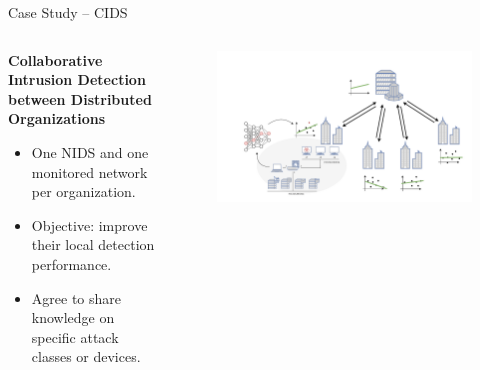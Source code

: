 \begin{frame}{Case Study -- CIDS}

  \begin{columns}
    \begin{column}{0.4\textwidth}
      \textbf{Collaborative Intrusion Detection between Distributed Organizations}
  \begin{itemize}[<+->]
    \item One NIDS and one monitored network per organization.
    \item \alert{Objective:} improve their local detection performance.
    \item Agree to share knowledge on specific attack classes or devices.
  \end{itemize}
    \end{column}
    
    \begin{column}{0.6\textwidth}
      \begin{figure}
        \centering
        \includegraphics[width=1.1\linewidth,right]{figures/intro/cids.drawio.pdf}
      \end{figure}
    \end{column}
  \end{columns}
\end{frame}



